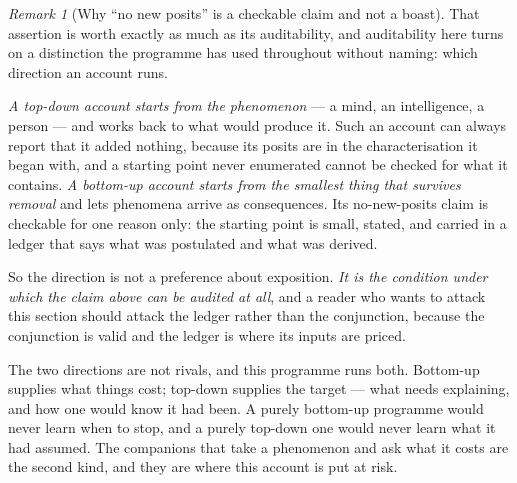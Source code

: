 \documentclass[11pt,a4paper]{article}
\theoremstyle{remark}
\newtheorem{remark}[definition]{Remark}
\begin{document}
\begin{remark}[Why ``no new posits'' is a checkable claim and not a boast]\label{rem:direction}
That assertion is worth exactly as much as its auditability, and auditability here turns on a
distinction the programme has used throughout without naming: which direction an account runs.

\emph{A top-down account starts from the phenomenon} --- a mind, an intelligence, a person --- and works
back to what would produce it. Such an account can always report that it added nothing, because its
posits are in the characterisation it began with, and a starting point never enumerated cannot be
checked for what it contains. \emph{A bottom-up account starts from the smallest thing that survives
removal} and lets phenomena arrive as consequences. Its no-new-posits claim is checkable for one reason
only: the starting point is small, stated, and carried in a ledger that says what was postulated and
what was derived.

So the direction is not a preference about exposition. \emph{It is the condition under which the claim
above can be audited at all}, and a reader who wants to attack this section should attack the ledger
rather than the conjunction, because the conjunction is valid and the ledger is where its inputs are
priced.

The two directions are not rivals, and this programme runs both. Bottom-up supplies what things cost;
top-down supplies the target --- what needs explaining, and how one would know it had been. A purely
bottom-up programme would never learn when to stop, and a purely top-down one would never learn what it
had assumed. The companions that take a phenomenon and ask what it costs are the second kind, and they
are where this account is put at risk.
\end{remark}
\end{document}
